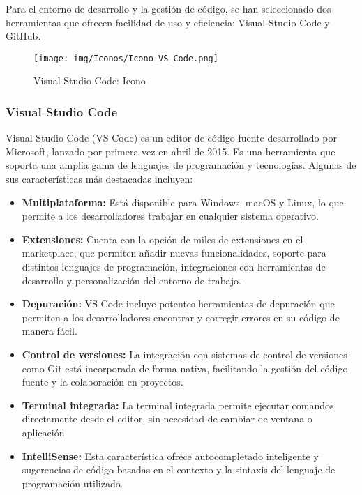 \documentclass[a4paper, 12pt]{book}
\begin{document}
    Para el entorno de desarrollo y la gestión de código, se han seleccionado dos herramientas que ofrecen facilidad de uso y eficiencia: Visual Studio Code y GitHub.
    
    
    \begin{figure}[H]
        \centering
        \texttt{[image: img/Iconos/Icono\_VS\_Code.png]}
        \caption{Visual Studio Code: Icono}
        \label{fig:enter-label}
    \end{figure}
    
    \subsubsection{Visual Studio Code}
    
    Visual Studio Code (VS Code) es un editor de código fuente desarrollado por Microsoft, lanzado por primera vez en abril de 2015. Es una herramienta que soporta una amplia gama de lenguajes de programación y tecnologías. Algunas de sus características más destacadas incluyen:
    \begin{itemize}
        \item\textbf{Multiplataforma:} Está disponible para Windows, macOS y Linux, lo que permite a los desarrolladores trabajar en cualquier sistema operativo.
        \item\textbf{Extensiones:} Cuenta con la opción de miles de extensiones en el marketplace, que permiten añadir nuevas funcionalidades, soporte para distintos lenguajes de programación, integraciones con herramientas de desarrollo y personalización del entorno de trabajo.
        \item\textbf{Depuración:} VS Code incluye potentes herramientas de depuración que permiten a los desarrolladores encontrar y corregir errores en su código de manera fácil.
        \item\textbf{Control de versiones:} La integración con sistemas de control de versiones como Git está incorporada de forma nativa, facilitando la gestión del código fuente y la colaboración en proyectos.
        \item\textbf{Terminal integrada:} La terminal integrada permite ejecutar comandos directamente desde el editor, sin necesidad de cambiar de ventana o aplicación.
        \item\textbf{IntelliSense:} Esta característica ofrece autocompletado inteligente y sugerencias de código basadas en el contexto y la sintaxis del lenguaje de programación utilizado.
    \end{itemize}
    
\end{document}
